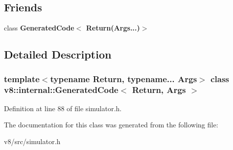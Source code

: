 \subsection*{Friends}
\begin{DoxyCompactItemize}
\item 
\mbox{\label{classv8_1_1internal_1_1GeneratedCode_a078770dcf4aa826933abe90a70591883}} 
class {\bfseries Generated\+Code$<$ Return(\+Args...)$>$}
\end{DoxyCompactItemize}


\subsection{Detailed Description}
\subsubsection*{template$<$typename Return, typename... Args$>$\newline
class v8\+::internal\+::\+Generated\+Code$<$ Return, Args $>$}



Definition at line 88 of file simulator.\+h.



The documentation for this class was generated from the following file\+:\begin{DoxyCompactItemize}
\item 
v8/src/simulator.\+h\end{DoxyCompactItemize}
